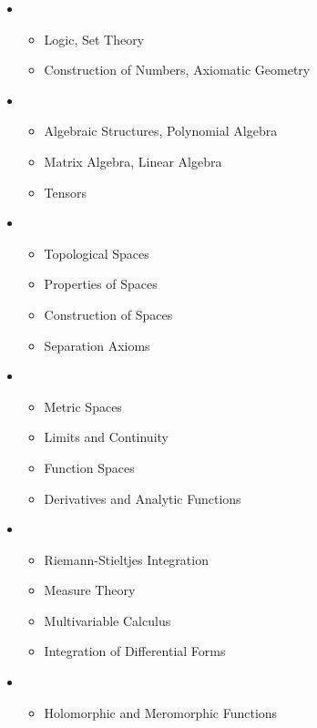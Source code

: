 \begin{itemize}
    \item {}
    \begin{itemize}
        \item Logic, Set Theory
        \item Construction of Numbers, Axiomatic Geometry
    \end{itemize}
    \item {}
    \begin{itemize}
        \item Algebraic Structures, Polynomial Algebra
        \item Matrix Algebra, Linear Algebra
        \item Tensors
    \end{itemize}
    \item {}
    \begin{itemize}
        \item Topological Spaces
        \item Properties of Spaces
        \item Construction of Spaces
        \item Separation Axioms
    \end{itemize}
    \item {}
    \begin{itemize}
        \item Metric Spaces
        \item Limits and Continuity
        \item Function Spaces
        \item Derivatives and Analytic Functions
    \end{itemize}
    \item {}
    \begin{itemize}
        \item Riemann-Stieltjes Integration
        \item Measure Theory
        \item Multivariable Calculus
        \item Integration of Differential Forms
    \end{itemize}
    \item {}
    \begin{itemize}
        \item Holomorphic and Meromorphic Functions

\end{itemize}
\end{itemize}
